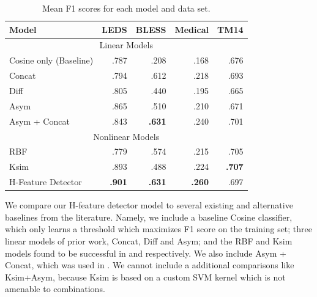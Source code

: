 \begin{table}
\centering
\begin{small}
\begin{tabular}{|l|rrrr|}
  \hline
  Model            &      LEDS   &      BLESS  &      Medical  &      TM14   \\
  \hline
  \hline
  \multicolumn{5}{|c|}{Linear Models}\\
  \hline
  Cosine only (Baseline)              &      .787   &      .208   &      .168     &      .676   \\
  Concat                              &      .794   &      .612   &      .218     &      .693   \\
  Diff \cite{weeds:2014:coling}       &      .805   &      .440   &      .195     &      .665   \\
  Asym \cite{roller:2014:coling}      &      .865   &      .510   &      .210     &      .671   \\
  Asym + Concat \cite{beltagy:2016:cl}&      .843   &  {\bf.631}  &      .240     &      .701   \\
  \hline
  \multicolumn{5}{|c|}{Nonlinear Models}\\
  \hline
  RBF                                         &      .779   &      .574   &      .215     &      .705   \\
  Ksim \cite{levy:2014:conll}                 &      .893   &      .488   &      .224     &  {\bf.707}  \\
  H-Feature Detector \cite{roller:2016:emnlp} &  {\bf.901}  &  {\bf.631}  &  {\bf.260}    &      .697   \\
  \hline
\end{tabular}
\end{small}
\caption{Mean F1 scores for each model and data set.}
\label{tab:hfeatureresults}
\end{table}

We compare our H-feature detector model to several existing and alternative
baselines from the literature. Namely, we include a baseline Cosine classifier,
which only learns a threshold which maximizes F1 score on the training set;
three linear models of prior work, Concat, Diff and Asym; and the RBF and Ksim
models found to be successful in  and
 respectively. We also include
Asym + Concat, which was used in . We cannot include a
additional comparisons like Ksim+Asym, because Ksim is based on a custom SVM
kernel which is not amenable to combinations.

